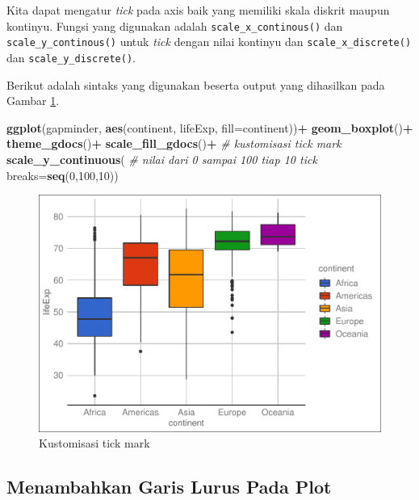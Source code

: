 \documentclass[]{book}
\newenvironment{Shaded}{\begin{snugshade}}{\end{snugshade}}
\newcommand{\KeywordTok}[1]{\textcolor[rgb]{0.13,0.29,0.53}{\textbf{#1}}}
\newcommand{\DataTypeTok}[1]{\textcolor[rgb]{0.13,0.29,0.53}{#1}}
\newcommand{\DecValTok}[1]{\textcolor[rgb]{0.00,0.00,0.81}{#1}}
\newcommand{\StringTok}[1]{\textcolor[rgb]{0.31,0.60,0.02}{#1}}
\newcommand{\CommentTok}[1]{\textcolor[rgb]{0.56,0.35,0.01}{\textit{#1}}}
\newcommand{\OperatorTok}[1]{\textcolor[rgb]{0.81,0.36,0.00}{\textbf{#1}}}
\newcommand{\NormalTok}[1]{#1}
\begin{document}
Kita dapat mengatur \emph{tick} pada axis baik yang memiliki skala
diskrit maupun kontinyu. Fungsi yang digunakan adalah
\texttt{scale\_x\_continous()} dan \texttt{scale\_y\_continous()} untuk
\emph{tick} dengan nilai kontinyu dan \texttt{scale\_x\_discrete()} dan
\texttt{scale\_y\_discrete()}.

Berikut adalah sintaks yang digunakan beserta output yang dihasilkan
pada Gambar \ref{fig:ggtick4}.

\begin{Shaded}
\begin{Highlighting}[]
\KeywordTok{ggplot}\NormalTok{(gapminder, }\KeywordTok{aes}\NormalTok{(continent, lifeExp,}
                      \DataTypeTok{fill=}\NormalTok{continent))}\OperatorTok{+}
\StringTok{  }\KeywordTok{geom_boxplot}\NormalTok{()}\OperatorTok{+}
\StringTok{  }\KeywordTok{theme_gdocs}\NormalTok{()}\OperatorTok{+}
\StringTok{  }\KeywordTok{scale_fill_gdocs}\NormalTok{()}\OperatorTok{+}
\StringTok{  }\CommentTok{# kustomisasi tick mark}
\StringTok{  }\KeywordTok{scale_y_continuous}\NormalTok{(}
    \CommentTok{# nilai dari 0 sampai 100 tiap 10 tick}
    \DataTypeTok{breaks=}\KeywordTok{seq}\NormalTok{(}\DecValTok{0}\NormalTok{,}\DecValTok{100}\NormalTok{,}\DecValTok{10}\NormalTok{))}
\end{Highlighting}
\end{Shaded}

\begin{figure}

{\centering \includegraphics[width=0.7\linewidth]{EnvStat_files/figure-latex/ggtick4-1} 

}

\caption{Kustomisasi tick mark}\label{fig:ggtick4}
\end{figure}

\subsection{Menambahkan Garis Lurus Pada
Plot}\label{menambahkan-garis-lurus-pada-plot}
\end{document}
